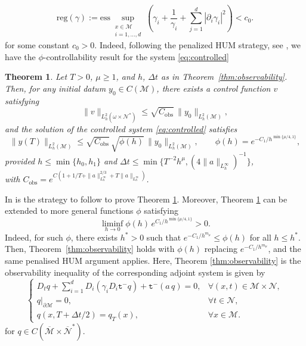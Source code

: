 \documentclass[11pt,oneside,leqno]{amsart}
\numberwithin{equation}{section}
\numberwithin{equation}{section}
\newtheorem{theorem}{Theorem}[section]
\newcommand{\trm}{\mathtt t^-}
\begin{document}
$$
 \mbox{reg}(\gamma):= \text{ess}\sup_{\substack{x\in \mathcal{M} \\ i=1,\ldots,d}}\left(\gamma_i+\frac{1}{\gamma_i}+{ \sum_{j=1}^{d}|\partial_{i}\gamma_i|^2}\right)<c_0.
$$
for some constant $c_0> 0$. Indeed, following the penalized HUM strategy, see \cite{boyer-canum}, we have the $\phi$-controllability result for the system \eqref{eq:controlled}
\begin{theorem}\label{thm:phi:controllability}
Let $T>0$, $\mu\geq 1$, and $h$, $\Delta t$ as in Theorem~\ref{thm:observability}. Then, for any initial datum $y_{0}\in C(\mathcal{M})$, there exists a control function $v$ satisfying
\begin{equation}\label{eq:control:bound}
\|v\|_{L^{2}_{h}(\omega\times\mathcal{N}^{\ast})}\leq\sqrt{C_{\text{obs}}}\,\|y_{0}\|_{L^{2}_{h}(\mathcal{M})},
\end{equation}
and the solution of the controlled system \eqref{eq:controlled} satisfies
\begin{equation}\label{eq:phi:null}
\|y(T)\|_{L^{2}_{h}(\mathcal{M})}\leq\sqrt{C_{\text{obs}}}\,\sqrt{\phi(h)}\,\|y_{0}\|_{L^{2}_{h}(\mathcal{M})},\qquad\phi(h)=e^{-C_{1}/h^{\min\{\mu/4,1\}}},
\end{equation}
provided $h\leq\min\{h_{0},h_{1}\}$ and $\Delta t\leq\min\{T^{-2}h^{\mu},(4\|a\|_{L^{\infty}_{h}})^{-1}\}$, \\with $C_{\mathrm{obs}}=e^{C(1+1/T+\|a\|_{L^{\infty}_{h}}^{2/3}+T\|a\|_{L^{\infty}_{h}})}$.
\end{theorem}
In \cite[section 4]{LMPZ:2023} is the strategy to follow to prove Theorem \ref{thm:phi:controllability}. Moreover, Theorem \ref{thm:phi:controllability} can be extended to more general functions $\phi$ satisfying
\begin{equation*}
\liminf_{h\to 0}\phi(h)\,e^{C_{1}/h^{\min\{\mu/4,1\}}}>0.
\end{equation*}
Indeed, for such $\phi$, there exists $h^{\ast}>0$ such that $e^{-C_{1}/h^{m_{\mu}}}\leq\phi(h)$ for all $h\leq h^{\ast}$. Then, Theorem~\ref{thm:observability} holds with $\phi(h)$ replacing $e^{-C_{1}/h^{m_{\mu}}}$, and the same penalised HUM argument applies. Here, Theorem \ref{thm:observability} is the observability inequality of  the corresponding adjoint system is given by
\begin{equation}\label{eq:adjoint}
\begin{cases}
D_{t}q+\sum_{i=1}^{d}D_{i}(\gamma_{i}D_{i}\trm q)+\trm(a\,q)=0,&\forall(x,t)\in\mathcal{M}\times\mathcal{N},\\
q\big|_{\partial\mathcal{M}}=0,&\forall t\in\mathcal{N},\\
q(x,T+\Delta t/2)=q_{T}(x),&\forall x\in\mathcal{M}.
\end{cases}
\end{equation}
 for $q\in C(\overline{\mathcal{M}}\times\overline{\mathcal{N}}^{\ast})$.\\
 
\end{document}
